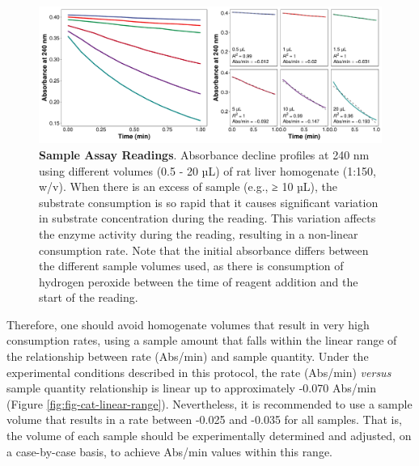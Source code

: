 \documentclass[
  9pt,
  american,
  a5paper,
  extrafontsizes,onecolumn,openright
  ]{memoir}
\begin{document}
\begin{figure}

{\centering \includegraphics[width=1\linewidth]{Volume-1_files/figure-latex/fig-cat-smp-vol-curves-1} 

}

\caption{\textbf{Sample Assay Readings}. Absorbance decline profiles at 240 nm using different volumes (0.5 - 20 µL) of rat liver homogenate (1:150, w/v). When there is an excess of sample (e.g., ≥ 10 µL), the substrate consumption is so rapid that it causes significant variation in substrate concentration during the reading. This variation affects the enzyme activity during the reading, resulting in a non-linear consumption rate. Note that the initial absorbance differs between the different sample volumes used, as there is consumption of hydrogen peroxide between the time of reagent addition and the start of the reading.}\label{fig:fig-cat-smp-vol-curves}
\end{figure}

\normalsize

Therefore, one should avoid homogenate volumes that result in very high consumption rates, using a sample amount that falls within the linear range of the relationship between rate (Abs/min) and sample quantity. Under the experimental conditions described in this protocol, the rate (Abs/min) \emph{versus} sample quantity relationship is linear up to approximately -0.070 Abs/min (Figure \ref{fig:fig-cat-linear-range}). Nevertheless, it is recommended to use a sample volume that results in a rate between -0.025 and -0.035 for all samples. That is, the volume of each sample should be experimentally determined and adjusted, on a case-by-case basis, to achieve Abs/min values within this range.



\scriptsize
\end{document}
